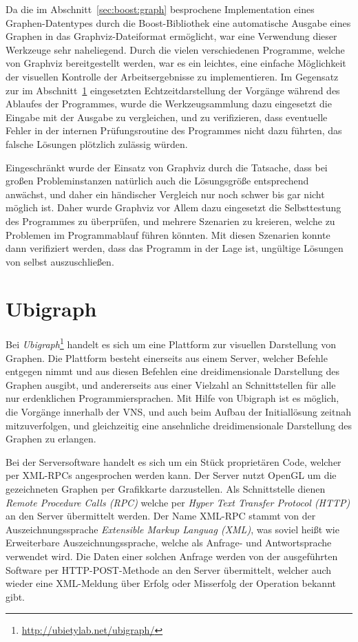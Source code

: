 Da die im Abschnitt~\ref{sec:boost:graph} besprochene Implementation eines Graphen-Datentypes durch die Boost-Bibliothek eine automatische Ausgabe eines Graphen in das Graphviz-Dateiformat er\-möglicht, war 
eine Verwendung dieser Werkzeuge sehr naheliegend. Durch die vielen verschiedenen Programme, welche von Graphviz bereitgestellt werden, war es ein leichtes, eine einfache Möglichkeit der visuellen Kontrolle
der Arbeitsergebnisse zu implementieren. Im Gegensatz zur im Abschnitt~\ref{sec:ubigraph} eingesetzten Echtzeitdarstellung der Vorgänge während des Ablaufes der Programmes, wurde die Werkzeugsammlung dazu eingesetzt
die Eingabe mit der Ausgabe zu vergleichen, und zu verifizieren, dass eventuelle Fehler in der internen Prüfungsroutine des Programmes nicht dazu führten, das falsche Lösungen plötzlich zulässig würden. 

Eingeschränkt wurde der Einsatz von Graphviz durch die Tatsache, dass bei großen Probleminstanzen natürlich auch die Lösungsgröße entsprechend anwächst, und daher ein händischer Vergleich nur noch schwer bis gar nicht möglich
ist. Daher wurde Graphviz vor Allem dazu eingesetzt die Selbsttestung des Programmes zu überprüfen, und mehrere Szenarien zu kreieren, welche zu Problemen im Programmablauf führen könnten. Mit diesen Szenarien
konnte dann verifiziert werden, dass das Programm in der Lage ist, ungültige Lösungen von selbst auszuschließen.


\section{Ubigraph}
\label{sec:ubigraph}
Bei \textit{Ubigraph}\footnote{\url{http://ubietylab.net/ubigraph/}} handelt es sich um eine Plattform zur visuellen Darstellung von Graphen. Die Plattform besteht einerseits aus einem Server, welcher Befehle entgegen nimmt und aus diesen Befehlen eine 
dreidimensionale Darstellung des Graphen ausgibt, und andererseits aus einer Vielzahl an Schnittstellen für alle nur erdenklichen Programmiersprachen. Mit Hilfe von Ubigraph ist es möglich, die
Vorgänge innerhalb der VNS, und auch beim Aufbau der Initiallösung zeitnah mitzuverfolgen, und gleichzeitig eine ansehnliche dreidimensionale Darstellung des Graphen zu erlangen.

Bei der Serversoftware handelt es sich um ein Stück proprietären Code, welcher per XML-RPCs angesprochen werden kann. Der Server nutzt OpenGL um die gezeichneten Graphen per Grafikkarte darzustellen. Als
Schnittstelle dienen \textit{Remote Procedure Calls (RPC)} welche per \textit{Hyper Text Transfer Protocol (HTTP)} an den Server übermittelt werden. Der Name XML-RPC stammt von der Auszeichnungssprache
\textit{Extensible Markup Languag (XML)}, was soviel heißt wie Erweiterbare Auszeichnungssprache, welche als Anfrage- und Antwortsprache verwendet wird. Die Daten einer solchen Anfrage werden von der
ausgeführten Software per HTTP-POST-Methode an den Server übermittelt, welcher auch wieder eine XML-Meldung über Erfolg oder Misserfolg der Operation bekannt gibt. 

